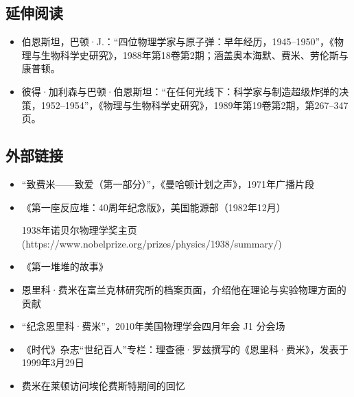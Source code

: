 \subsection{延伸阅读}
\begin{itemize}
\item 伯恩斯坦，巴顿·J.：“四位物理学家与原子弹：早年经历，1945–1950”，《物理与生物科学史研究》，1988年第18卷第2期；涵盖奥本海默、费米、劳伦斯与康普顿。
\item 彼得·加利森与巴顿·伯恩斯坦：“在任何光线下：科学家与制造超级炸弹的决策，1952–1954”，《物理与生物科学史研究》，1989年第19卷第2期，第267–347页。
\end{itemize}
\subsection{外部链接}
\begin{itemize}
\item “致费米——致爱（第一部分）”，《曼哈顿计划之声》，1971年广播片段
\item 《第一座反应堆：40周年纪念版》，美国能源部（1982年12月）
\item [1938年诺贝尔物理学奖主页](https://www.nobelprize.org/prizes/physics/1938/summary/)
\item 《第一堆堆的故事》
\item 恩里科·费米在富兰克林研究所的档案页面，介绍他在理论与实验物理方面的贡献
\item “纪念恩里科·费米”，2010年美国物理学会四月年会 J1 分会场
\item 《时代》杂志“世纪百人”专栏：理查德·罗兹撰写的《恩里科·费米》，发表于1999年3月29日
\item 费米在莱顿访问埃伦费斯特期间的回忆
\end{itemize}